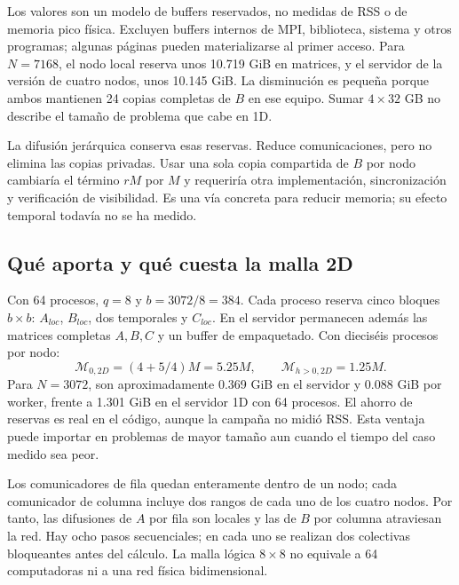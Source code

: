 \begin{table}[H]\caption{Reservas explícitas de matrices calculadas desde el código 1D, tanto global como jerárquico. La tabla considera el reparto exacto de filas, incluso si $N$ no es divisible por $P$.}\label{tab:memoria}

\end{table}

Los valores son un modelo de buffers reservados, no medidas de RSS o de memoria pico física. Excluyen buffers internos de MPI, biblioteca, sistema y otros programas; algunas páginas pueden materializarse al primer acceso. Para $N=7168$, el nodo local reserva unos 10.719 GiB en matrices, y el servidor de la versión de cuatro nodos, unos 10.145 GiB. La disminución es pequeña porque ambos mantienen 24 copias completas de $B$ en ese equipo. Sumar $4\times32$ GB no describe el tamaño de problema que cabe en 1D.

La difusión jerárquica conserva esas reservas. Reduce comunicaciones, pero no elimina las copias privadas. Usar una sola copia compartida de $B$ por nodo cambiaría el término $rM$ por $M$ y requeriría otra implementación, sincronización y verificación de visibilidad. Es una vía concreta para reducir memoria; su efecto temporal todavía no se ha medido.

\subsection{Qué aporta y qué cuesta la malla 2D}

Con 64 procesos, $q=8$ y $b=3072/8=384$. Cada proceso reserva cinco bloques $b\times b$: $A_{loc}$, $B_{loc}$, dos temporales y $C_{loc}$. En el servidor permanecen además las matrices completas $A,B,C$ y un buffer de empaquetado. Con dieciséis procesos por nodo:
\[
 \mathcal M_{0,2D}=(4+5/4)M=5.25M,\qquad
 \mathcal M_{h>0,2D}=1.25M.
\]
Para $N=3072$, son aproximadamente 0.369 GiB en el servidor y 0.088 GiB por worker, frente a 1.301 GiB en el servidor 1D con 64 procesos. El ahorro de reservas es real en el código, aunque la campaña no midió RSS. Esta ventaja puede importar en problemas de mayor tamaño aun cuando el tiempo del caso medido sea peor.


Los comunicadores de fila quedan enteramente dentro de un nodo; cada comunicador de columna incluye dos rangos de cada uno de los cuatro nodos. Por tanto, las difusiones de $A$ por fila son locales y las de $B$ por columna atraviesan la red. Hay ocho pasos secuenciales; en cada uno se realizan dos colectivas bloqueantes antes del cálculo. La malla lógica $8\times8$ no equivale a 64 computadoras ni a una red física bidimensional.

